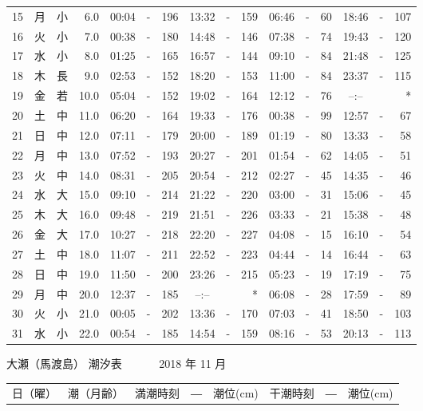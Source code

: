 \documentclass[12pt.a4j]{jsarticle}
\begin{document}
\begin{center}
\begin{table}[ht]
\begin{tabular}{|rc|cr|ccrccr|ccrccr|}
15 & 月 & 小 &  6.0 & 00:04 &-& 196 & 13:32 &-& 159 & 06:46 &-&  60 & 18:46 &-& 107 \\
16 & 火 & 小 &  7.0 & 00:38 &-& 180 & 14:48 &-& 146 & 07:38 &-&  74 & 19:43 &-& 120 \\
17 & 水 & 小 &  8.0 & 01:25 &-& 165 & 16:57 &-& 144 & 09:10 &-&  84 & 21:48 &-& 125 \\
18 & 木 & 長 &  9.0 & 02:53 &-& 152 & 18:20 &-& 153 & 11:00 &-&  84 & 23:37 &-& 115 \\
19 & 金 & 若 & 10.0 & 05:04 &-& 152 & 19:02 &-& 164 & 12:12 &-&  76 & --:-- & &  *  \\
20 & 土 & 中 & 11.0 & 06:20 &-& 164 & 19:33 &-& 176 & 00:38 &-&  99 & 12:57 &-&  67 \\
21 & 日 & 中 & 12.0 & 07:11 &-& 179 & 20:00 &-& 189 & 01:19 &-&  80 & 13:33 &-&  58 \\
22 & 月 & 中 & 13.0 & 07:52 &-& 193 & 20:27 &-& 201 & 01:54 &-&  62 & 14:05 &-&  51 \\
23 & 火 & 中 & 14.0 & 08:31 &-& 205 & 20:54 &-& 212 & 02:27 &-&  45 & 14:35 &-&  46 \\
24 & 水 & 大 & 15.0 & 09:10 &-& 214 & 21:22 &-& 220 & 03:00 &-&  31 & 15:06 &-&  45 \\
25 & 木 & 大 & 16.0 & 09:48 &-& 219 & 21:51 &-& 226 & 03:33 &-&  21 & 15:38 &-&  48 \\
26 & 金 & 大 & 17.0 & 10:27 &-& 218 & 22:20 &-& 227 & 04:08 &-&  15 & 16:10 &-&  54 \\
27 & 土 & 中 & 18.0 & 11:07 &-& 211 & 22:52 &-& 223 & 04:44 &-&  14 & 16:44 &-&  63 \\
28 & 日 & 中 & 19.0 & 11:50 &-& 200 & 23:26 &-& 215 & 05:23 &-&  19 & 17:19 &-&  75 \\
29 & 月 & 中 & 20.0 & 12:37 &-& 185 & --:-- & &  *  & 06:08 &-&  28 & 17:59 &-&  89 \\
30 & 火 & 小 & 21.0 & 00:05 &-& 202 & 13:36 &-& 170 & 07:03 &-&  41 & 18:50 &-& 103 \\
31 & 水 & 小 & 22.0 & 00:54 &-& 185 & 14:54 &-& 159 & 08:16 &-&  53 & 20:13 &-& 113 \\
\hline
\end{tabular}
\end{table}
\newpage
{\LARGE 大瀬（馬渡島）  潮汐表　　　}
{\large 2018 年 11 月}\\
\begin{table}[ht]
\begin{tabular}{|rc|cr|ccrccr|ccrccr|}
\hline
\multicolumn{2}{|c|}{日（曜）} & \multicolumn{2}{c|}{潮（月齢）} & \multicolumn{6}{c|}{満潮時刻　―　潮位(cm)} & \multicolumn{6}{c|}{干潮時刻　―　潮位(cm)} \\

\end{tabular}
\end{table}
\end{center}
\end{document}
